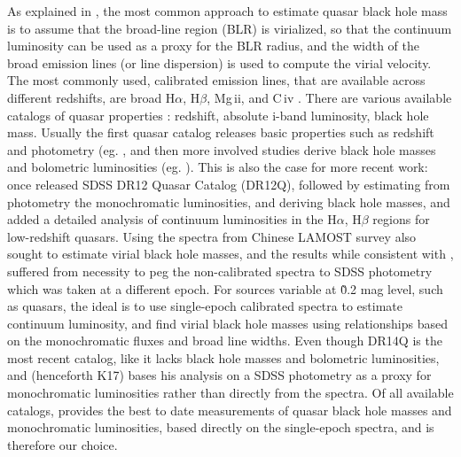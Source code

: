 \documentclass[twocolumn]{aastex62}
\begin{document}
As explained in \citep{shen2008,shen2011}, the most common approach to estimate quasar black hole mass is to assume that the broad-line region (BLR) is virialized, so that the continuum luminosity can be used as a proxy for the BLR radius, and the width of the broad emission lines (or line dispersion) is used to compute the virial velocity. The most commonly used, calibrated emission lines, that are available across different redshifts, are broad H$\alpha$, H$\beta$, Mg\,{\sc ii}, and C\,{\sc iv} \citep{vestergaard2002}. 
There are various available catalogs of quasar properties : redshift, absolute i-band luminosity, black hole mass.  Usually the first quasar catalog releases basic properties such as redshift and photometry (eg. \citealt{schneider2007, schneider2010}, and then more involved studies derive black hole masses and bolometric luminosities (eg. \citealt{shen2008, shen2011}). This is also the case for more recent work:  once \citep{paris2017} released SDSS DR12 Quasar Catalog (DR12Q),  \citep{kozlowski2017a} followed by estimating from photometry the monochromatic luminosities,  and  deriving black hole masses, and \citep{chen2018} added a detailed analysis of continuum luminosities in the  H$\alpha$, H$\beta$ regions for low-redshift quasars. Using the spectra from Chinese LAMOST survey \citep{dong2018} also sought to estimate virial black hole masses, and the results while consistent with \citep{shen2011}, suffered from necessity to peg the non-calibrated spectra to SDSS photometry which was taken at a different epoch.  For sources variable at \~0.2 mag level, such as quasars, the ideal is to use single-epoch calibrated spectra to estimate continuum luminosity, and find virial black hole masses using relationships based on the monochromatic fluxes and broad line widths. Even though \cite{paris2018} DR14Q is the most recent catalog, like \citep{paris2017} it lacks black hole masses and bolometric luminosities, and \citep{kozlowski2017a} (henceforth K17)  bases his analysis on a SDSS photometry as a proxy for monochromatic luminosities rather than directly from the spectra. Of all available catalogs,  \citep{shen2011} provides the best to date measurements of quasar black hole masses and monochromatic luminosities, based directly on the single-epoch spectra, and is therefore our choice. 
\end{document}
